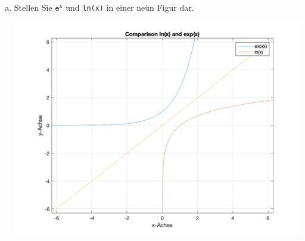 \begin{enumerate}[a)]
\begin{center}
\end{center}
\item Stellen Sie $\texttt{e}^\texttt{x}$ und \texttt{ln(x)} in einer neün Figur dar.

\begin{center}
\includegraphics[scale=0.3]{../../PROJEKTE/ubungm2c/ubungm2c.png}
\end{center}
\end{enumerate}










